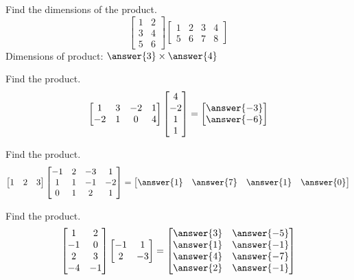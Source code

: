 \documentclass{ximera}
\begin{document}
\begin{problem}\label{prob:matproddim2}
Find the dimensions of the product.
$$\begin{bmatrix}1&2\\3&4\\5&6\end{bmatrix}\begin{bmatrix}1&2&3&4\\5&6&7&8\end{bmatrix}$$
Dimensions of product: $\answer{3}\times \answer{4}$
\end{problem}

\begin{problem}\label{prob:matprod1}
Find the product.
$$\begin{bmatrix}1&3&-2&1\\-2&1&0&4\end{bmatrix}\begin{bmatrix}4\\-2\\1\\1\end{bmatrix}=\begin{bmatrix}\answer{-3}\\\answer{-6}\end{bmatrix}$$
\end{problem}

\begin{problem}\label{prob:matprod2}
Find the product.
$$\begin{bmatrix}1&2&3\end{bmatrix}\begin{bmatrix}-1&2&-3&1\\1&1&-1&-2\\0&1&2&1\end{bmatrix}=\begin{bmatrix}\answer{1}&\answer{7}&\answer{1}&\answer{0}\end{bmatrix}$$
\end{problem}

\begin{problem}\label{prob:matprod3}
Find the product.
$$\begin{bmatrix}1&2\\-1&0\\2&3\\-4&-1\end{bmatrix}\begin{bmatrix}-1&1\\2&-3\end{bmatrix}=\begin{bmatrix}\answer{3}&\answer{-5}\\\answer{1}&\answer{-1}\\\answer{4}&\answer{-7}\\\answer{2}&\answer{-1}\end{bmatrix}
$$
\end{problem}
\end{document}
